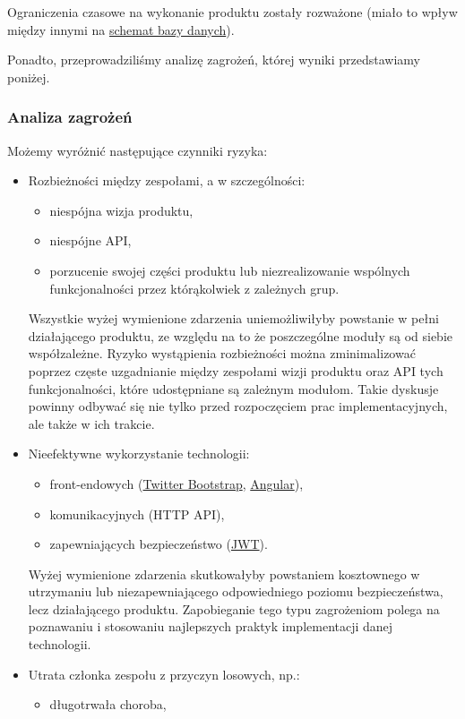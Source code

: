 \documentclass[polish,12pt]{aghthesis}
\begin{document}
Ograniczenia czasowe na wykonanie produktu zostały rozważone (miało to wpływ między innymi na \hyperref[subsec:wykorzystane-technologie-baza]{schemat bazy danych}).

Ponadto, przeprowadziliśmy analizę zagrożeń, której wyniki przedstawiamy poniżej.

\subsubsection{Analiza zagrożeń}
Możemy wyróżnić następujące czynniki ryzyka:
\begin{itemize}
  \item Rozbieżności między zespołami, a w szczególności:
  \begin{itemize}
    \item niespójna wizja produktu,
    \item niespójne API,
    \item porzucenie swojej części produktu lub niezrealizowanie wspólnych funkcjonalności przez którąkolwiek z zależnych grup.
  \end{itemize}
  Wszystkie wyżej wymienione zdarzenia uniemożliwiłyby powstanie w pełni działającego produktu, ze względu na to że poszczególne moduły są od siebie współzależne. Ryzyko wystąpienia rozbieżności można zminimalizować poprzez częste uzgadnianie między zespołami wizji produktu oraz API tych funkcjonalności, które udostępniane są zależnym modułom. Takie dyskusje powinny odbywać się nie tylko przed rozpoczęciem prac implementacyjnych, ale także w ich trakcie.
  \item Nieefektywne wykorzystanie technologii:
  \begin{itemize}
    \item front-endowych (\href{https://getbootstrap.com/}{Twitter Bootstrap}, \href{https://angular.io/}{Angular}),
    \item komunikacyjnych (HTTP API),
    \item zapewniających bezpieczeństwo (\href{https://jwt.io/}{JWT}).
  \end{itemize}
  Wyżej wymienione zdarzenia skutkowałyby powstaniem kosztownego w utrzymaniu lub niezapewniającego odpowiedniego poziomu bezpieczeństwa, lecz działającego produktu. Zapobieganie tego typu zagrożeniom polega na poznawaniu i stosowaniu najlepszych praktyk implementacji danej technologii.
  \item Utrata członka zespołu z przyczyn losowych, np.:
  \begin{itemize}
      \item długotrwała choroba,

\end{itemize}
\end{itemize}
\end{document}
